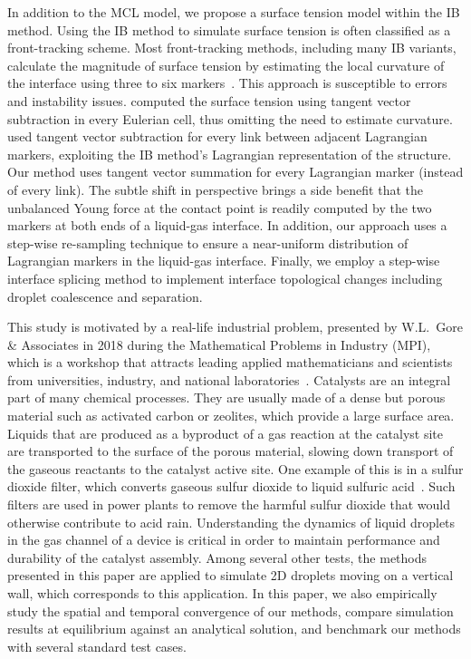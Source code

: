 \documentclass[%
 aip,
 amsmath,amssymb,
 reprint,
 floatfix
]{revtex4-1}
\begin{document}
In addition to the MCL model, we propose a surface tension model within the IB method. Using the IB method to simulate surface tension is often classified as a front-tracking scheme. Most front-tracking methods, including many IB variants, calculate the magnitude of surface tension by estimating the local curvature of the interface using three to six markers~\cite{leveque1997immersed, huang2018improved}. This approach is susceptible to errors and instability issues. \citet{tryggvason2001front} computed the surface tension using tangent vector subtraction in every Eulerian cell, thus omitting the need to estimate curvature. \citet{popinet1999front} used tangent vector subtraction for every link between adjacent Lagrangian markers, exploiting the IB method's Lagrangian representation of the structure. Our method uses tangent vector summation for every Lagrangian marker (instead of every link). The subtle shift in perspective brings a side benefit that the unbalanced Young force \cite{quian2003generalized} at the contact point is readily computed by the two markers at both ends of a liquid-gas interface. In addition, our approach uses a step-wise re-sampling technique to ensure a near-uniform distribution of Lagrangian markers in the liquid-gas interface. Finally, we employ a step-wise interface splicing method to implement interface topological changes including droplet coalescence and separation. 

This study is motivated by a real-life industrial problem, presented by W.L.~Gore \& Associates in 2018 during the Mathematical Problems in Industry (MPI), which is a workshop that attracts leading applied mathematicians and scientists from universities, industry, and national laboratories~\cite{cimpeanu2021motion}. Catalysts are an integral part of many chemical processes. They are usually made of a dense but porous material such as activated carbon or zeolites, which provide a large surface area. Liquids that are produced as a byproduct of a gas reaction at the catalyst site are transported to the surface of the porous material, slowing down transport of the gaseous reactants to the catalyst active site. One example of this is in a sulfur dioxide filter, which converts gaseous sulfur dioxide to liquid sulfuric acid~\cite{kiradjiev2020simple,kiradjiev2021homogenized}. Such filters are used in power plants to remove the harmful sulfur dioxide that would otherwise contribute to acid rain. Understanding the dynamics of liquid droplets in the gas channel of a device is critical in order to maintain performance and durability of the catalyst assembly. Among several other tests, the methods presented in this paper are applied to simulate 2D droplets moving on a vertical wall, which corresponds to this application. In this paper, we also empirically study the spatial and temporal convergence of our methods, compare simulation results at equilibrium against an analytical solution, and benchmark our methods with several standard test cases.
\end{document}
